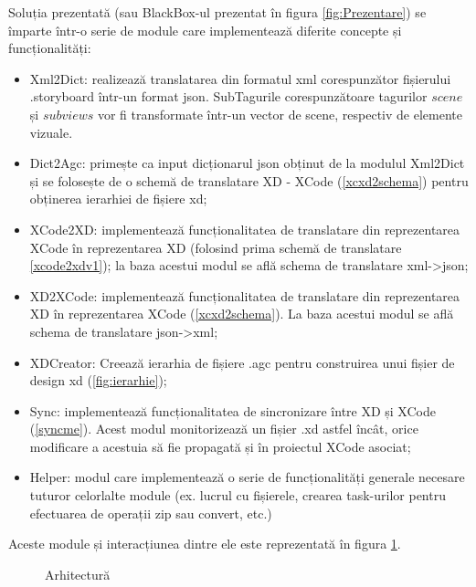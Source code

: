 Soluția prezentată (sau BlackBox-ul prezentat în figura \ref{fig:Prezentare}) se împarte într-o serie de module care implementează diferite concepte și funcționalități:
\begin{itemize} 
\item Xml2Dict: realizează translatarea din formatul xml corespunzător fișierului .storyboard într-un format json. SubTagurile corespunzătoare tagurilor $scene$ și $subviews$ vor fi transformate într-un vector de scene, respectiv de elemente vizuale.
\item Dict2Agc: primește ca input dicționarul json obținut de la modulul Xml2Dict și se folosește de o schemă de translatare XD - XCode (\ref{xcxd2schema}) pentru obținerea ierarhiei de fișiere xd;
\item XCode2XD: implementează funcționalitatea de translatare din reprezentarea XCode în reprezentarea XD (folosind prima schemă de translatare \ref{xcode2xdv1}); la baza acestui modul se află schema de translatare xml->json;
\item XD2XCode: implementează funcționalitatea de translatare din reprezentarea XD în reprezentarea XCode (\ref{xcxd2schema}). La baza acestui modul se află schema de translatare json->xml;
\item XDCreator: Creează ierarhia de fișiere .agc pentru construirea unui fișier de design xd (\ref{fig:ierarhie});
\item Sync: implementează funcționalitatea de sincronizare între XD și XCode (\ref{syncme}). Acest modul monitorizează un fișier .xd astfel încât, orice modificare a acestuia să fie propagată și în proiectul XCode asociat;
\item Helper: modul care implementează o serie de funcționalități generale necesare tuturor celorlalte module (ex. lucrul cu fișierele, crearea task-urilor pentru efectuarea de operații zip sau convert, etc.)
\end{itemize}

Aceste module și interacțiunea dintre ele este reprezentată în figura \ref{fig:Arhitectura}.

\begin{figure}[!htbp]
\centering
{}
\caption{Arhitectură} \label{fig:Arhitectura}
\end{figure}

